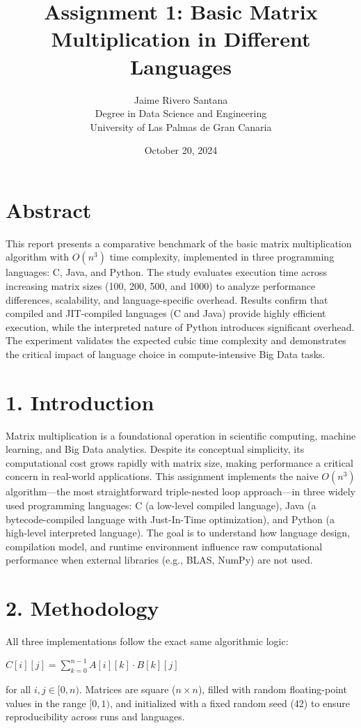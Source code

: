 \documentclass[12pt]{article}
\title{Assignment 1: Basic Matrix Multiplication in Different Languages}
\author{Jaime Rivero Santana \\ Degree in Data Science and Engineering \\ University of Las Palmas de Gran Canaria}
\date{October 20, 2024}
\begin{document}
\maketitle

\section*{Abstract}
This report presents a comparative benchmark of the basic matrix multiplication algorithm with $O(n^3)$ time complexity, implemented in three programming languages: C, Java, and Python. The study evaluates execution time across increasing matrix sizes (100, 200, 500, and 1000) to analyze performance differences, scalability, and language-specific overhead. Results confirm that compiled and JIT-compiled languages (C and Java) provide highly efficient execution, while the interpreted nature of Python introduces significant overhead. The experiment validates the expected cubic time complexity and demonstrates the critical impact of language choice in compute-intensive Big Data tasks.

\section*{1. Introduction}
Matrix multiplication is a foundational operation in scientific computing, machine learning, and Big Data analytics. Despite its conceptual simplicity, its computational cost grows rapidly with matrix size, making performance a critical concern in real-world applications. This assignment implements the naive $O(n^3)$ algorithm---the most straightforward triple-nested loop approach---in three widely used programming languages: C (a low-level compiled language), Java (a bytecode-compiled language with Just-In-Time optimization), and Python (a high-level interpreted language). The goal is to understand how language design, compilation model, and runtime environment influence raw computational performance when external libraries (e.g., BLAS, NumPy) are not used.

\section*{2. Methodology}
All three implementations follow the exact same algorithmic logic:
\begin{center}
$C[i][j] = \sum_{k=0}^{n-1} A[i][k] \cdot B[k][j]$
\end{center}
for all $i, j \in [0, n)$. Matrices are square ($n \times n$), filled with random floating-point values in the range $[0, 1)$, and initialized with a fixed random seed (42) to ensure reproducibility across runs and languages.
\end{document}

